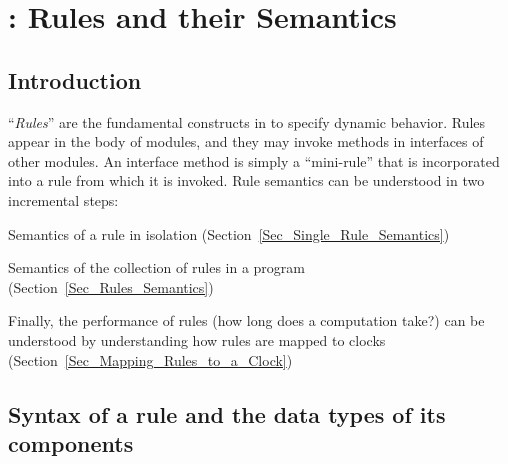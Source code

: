 

\chapter{{\BSV}: Rules and their Semantics}


\setcounter{page}{1}
\renewcommand{\thepage}{\arabic{chapter}-\arabic{page}}

\label{ch_Rules_I}


\section{Introduction}

``\emph{Rules}'' are the fundamental constructs in {\BSV} to specify
dynamic behavior.  Rules appear in the body of {\BSV} modules, and they
may invoke methods in interfaces of other modules.  An interface
method is simply a ``mini-rule'' that is incorporated into a rule from
which it is invoked.  Rule semantics can be understood in two
incremental steps:

\begin{tightlist}

 \item Semantics of a rule in isolation (Section~\ref{Sec_Single_Rule_Semantics})

 \item Semantics of the collection of rules in a {\BSV} program
       (Section~\ref{Sec_Rules_Semantics})

\end{tightlist}

Finally, the performance of rules (how long does a computation take?)
can be understood by understanding how rules are mapped to clocks
(Section~\ref{Sec_Mapping_Rules_to_a_Clock})


\section{Syntax of a rule and the data types of its components}

